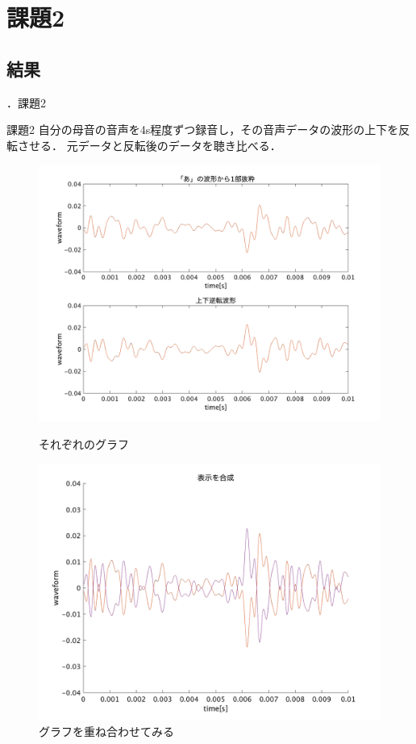 \documentclass[aspectratio=43]{beamer}
\newcommand{\showsec}{\thesection ．}
\begin{document}
\section{課題2}
\subsection{結果}
\begin{frame}[t]{\showsec 課題2}
    \begin{exampleblock}{課題2}
        自分の母音の音声を4s程度ずつ録音し，その音声データの波形の上下を反転させる．
        元データと反転後のデータを聴き比べる．
    \end{exampleblock}
    \begin{figure}
        \centering
        \begin{minipage}[t]{0.49\textwidth}
            \centering
            \includegraphics[keepaspectratio,width=\textwidth]{no2_ans.png}
            \caption{それぞれのグラフ}
        \end{minipage}
        \begin{minipage}[t]{0.49\textwidth}
            \centering
            \includegraphics[keepaspectratio,width=\textwidth]{no2_ans_2.png}
            \caption{グラフを重ね合わせてみる}
        \end{minipage}
    \end{figure}
\end{frame}
\end{document}

